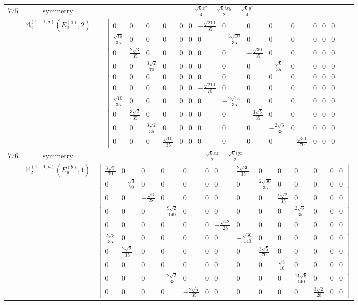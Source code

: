 \documentclass[fleqn,8pt,landscape]{jsarticle}
\begin{document}
\begin{longtable}{ccc}
$ 775 $ & $ \text{symmetry} $ & $ \frac{\sqrt{6} x^{2}}{4} - \frac{\sqrt{6} i x y}{2} - \frac{\sqrt{6} y^{2}}{4} $ \\
$  $ & $ \mathbb{M}_{2}^{(1,-1;a)}(E_{u}^{(a)},2) $ & $ \begin{bmatrix} 0 & 0 & 0 & 0 & 0 & 0 & - \frac{\sqrt{210}}{35} & 0 & 0 & 0 & 0 & 0 & 0 & 0 \\ \frac{\sqrt{15}}{35} & 0 & 0 & 0 & 0 & 0 & 0 & - \frac{3 \sqrt{10}}{35} & 0 & 0 & 0 & 0 & 0 & 0 \\ 0 & \frac{2 \sqrt{3}}{35} & 0 & 0 & 0 & 0 & 0 & 0 & - \frac{\sqrt{30}}{35} & 0 & 0 & 0 & 0 & 0 \\ 0 & 0 & \frac{3 \sqrt{2}}{70} & 0 & 0 & 0 & 0 & 0 & 0 & - \frac{\sqrt{6}}{35} & 0 & 0 & 0 & 0 \\ 0 & 0 & 0 & 0 & 0 & 0 & 0 & 0 & 0 & 0 & 0 & 0 & 0 & 0 \\ 0 & 0 & 0 & 0 & 0 & 0 & - \frac{\sqrt{210}}{70} & 0 & 0 & 0 & 0 & 0 & 0 & 0 \\ \frac{\sqrt{10}}{35} & 0 & 0 & 0 & 0 & 0 & 0 & - \frac{2 \sqrt{15}}{35} & 0 & 0 & 0 & 0 & 0 & 0 \\ 0 & \frac{3 \sqrt{2}}{35} & 0 & 0 & 0 & 0 & 0 & 0 & - \frac{3 \sqrt{5}}{35} & 0 & 0 & 0 & 0 & 0 \\ 0 & 0 & \frac{3 \sqrt{2}}{35} & 0 & 0 & 0 & 0 & 0 & 0 & - \frac{2 \sqrt{6}}{35} & 0 & 0 & 0 & 0 \\ 0 & 0 & 0 & \frac{\sqrt{10}}{35} & 0 & 0 & 0 & 0 & 0 & 0 & - \frac{\sqrt{30}}{70} & 0 & 0 & 0 \end{bmatrix} $ \\ \hline
$ 776 $ & $ \text{symmetry} $ & $ \frac{\sqrt{6} x z}{2} - \frac{\sqrt{6} i y z}{2} $ \\
$  $ & $ \mathbb{M}_{2}^{(1,-1;a)}(E_{u}^{(b)},1) $ & $ \begin{bmatrix} \frac{3 \sqrt{5}}{70} & 0 & 0 & 0 & 0 & 0 & 0 & \frac{2 \sqrt{30}}{35} & 0 & 0 & 0 & 0 & 0 & 0 \\ 0 & - \frac{\sqrt{3}}{70} & 0 & 0 & 0 & 0 & 0 & 0 & \frac{2 \sqrt{30}}{35} & 0 & 0 & 0 & 0 & 0 \\ 0 & 0 & - \frac{\sqrt{6}}{28} & 0 & 0 & 0 & 0 & 0 & 0 & \frac{6 \sqrt{2}}{35} & 0 & 0 & 0 & 0 \\ 0 & 0 & 0 & - \frac{9 \sqrt{2}}{140} & 0 & 0 & 0 & 0 & 0 & 0 & \frac{2 \sqrt{6}}{35} & 0 & 0 & 0 \\ 0 & 0 & 0 & 0 & 0 & 0 & - \frac{\sqrt{42}}{28} & 0 & 0 & 0 & 0 & 0 & 0 & 0 \\ \frac{2 \sqrt{5}}{35} & 0 & 0 & 0 & 0 & 0 & 0 & - \frac{\sqrt{30}}{140} & 0 & 0 & 0 & 0 & 0 & 0 \\ 0 & \frac{2 \sqrt{2}}{35} & 0 & 0 & 0 & 0 & 0 & 0 & \frac{3 \sqrt{5}}{70} & 0 & 0 & 0 & 0 & 0 \\ 0 & 0 & 0 & 0 & 0 & 0 & 0 & 0 & 0 & \frac{\sqrt{3}}{10} & 0 & 0 & 0 & 0 \\ 0 & 0 & 0 & - \frac{2 \sqrt{2}}{35} & 0 & 0 & 0 & 0 & 0 & 0 & \frac{11 \sqrt{6}}{140} & 0 & 0 & 0 \\ 0 & 0 & 0 & 0 & - \frac{2 \sqrt{5}}{35} & 0 & 0 & 0 & 0 & 0 & 0 & \frac{3 \sqrt{2}}{28} & 0 & 0 \end{bmatrix} $ \\ \hline

\end{longtable}
\end{document}
